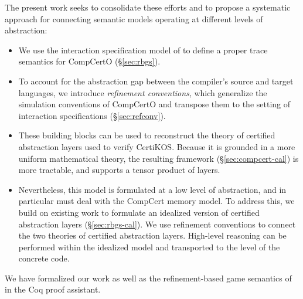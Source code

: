 \documentclass[acmsmall,review,anonymous]{acmart}\settopmatter{printfolios=true,printccs=false,printacmref=false}
\begin{document}
The present work 
seeks to consolidate these efforts
and to propose a systematic approach
for connecting semantic models
operating at different levels of abstraction:
\begin{itemize}
  \item We use the interaction specification model of \citet{rbgs-cal}
    to define a proper trace semantics for CompCertO
    (\S\ref{sec:rbgs}).
  \item To account for the abstraction gap between
    the compiler's source and target languages,
    we introduce \emph{refinement conventions},
    which generalize the simulation conventions of CompCertO
    and transpose them to the setting of
    interaction specifications
    (\S\ref{sec:refconv}).
  \item These building blocks can be used to reconstruct
    the theory of certified abstraction layers
    used to verify CertiKOS.
    Because it is grounded in a more uniform mathematical theory,
    the resulting framework (\S\ref{sec:compcert-cal})
    is more tractable,
    and supports a tensor product of layers.
  \item 
    Nevertheless,
    this model is formulated at a low level of abstraction,
    and in particular must deal with the CompCert memory model.
    To address this, we build on existing work
    to formulate an idealized version of certified abstraction layers
    (\S\ref{sec:rbgs-cal}).
    We use refinement conventions
    to connect the two theories of certified abstraction layers.
    High-level reasoning can be performed
    within the idealized model
    and transported to the level of the concrete code.
\end{itemize}
We have formalized our work as well as
the refinement-based game semantics of \citet{rbgs-cal}
in the Coq proof assistant.
\end{document}
